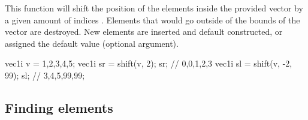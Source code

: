 \documentclass[12pt]{report}
\newenvironment{example}
{
    \begin{mdframed}[style=example,frametitle={Example}]
}
{
    \end{mdframed}
}
\begin{document}
\begin{itemize}
This function will shift the position of the elements inside the provided vector  by a given amount of indices . Elements that would go outside of the bounds of the vector are destroyed. New elements are inserted and default constructed, or assigned the default value  (optional argument).

\begin{example}
\begin{cppcode}
vec1i v = {1,2,3,4,5};
vec1i sr = shift(v, 2);
sr; // {0,0,1,2,3}
vec1i sl = shift(v, -2, 99);
sl; // {3,4,5,99,99};
\end{cppcode}
\end{example}
\end{itemize}

\subsection{Finding elements}
\end{document}
